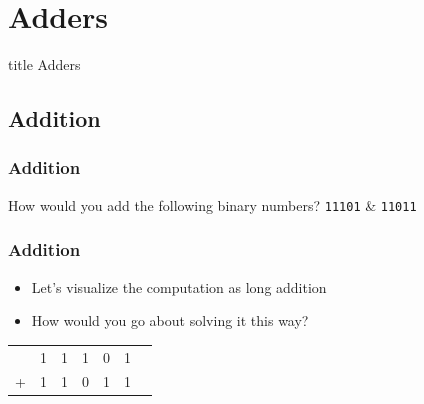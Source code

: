 \documentclass{beamer}
\begin{document}
    \section{Adders}
    
    	\begin{frame}
                \vfill
                \centering
                \begin{beamercolorbox}[sep=8pt,center,shadow=true,rounded=true]{title}
                    Adders\par%
                \end{beamercolorbox}
                \vfill
             \end{frame}
    
    	\subsection{Addition}
    
    	\begin{frame}
    		\frametitle{Addition}
    		\begin{center}
    			{\Large How would you add the following binary numbers?}
    			\linebreak
    			{\Large \texttt{11101} \& \texttt{11011}}
    		\end{center}
    	\end{frame}
    	
    	\begin{frame}
    		\frametitle{Addition}
    		\begin{itemize}
    			\item Let's visualize the computation as long addition
    			\item How would you go about solving it this way?
			\end{itemize}
			
			\centering
			{\LARGE
			\begin{tabular}{c@{\,}c@{\,}c@{\,}c@{\,}c@{\,}c@{\,}c}
					   & 1 & 1 & 1 & 0 & 1 \\
					 + & 1 & 1 & 0 & 1 & 1 \\
					\hline
					
			\end{tabular}}
		\end{frame}
		
\end{document}
